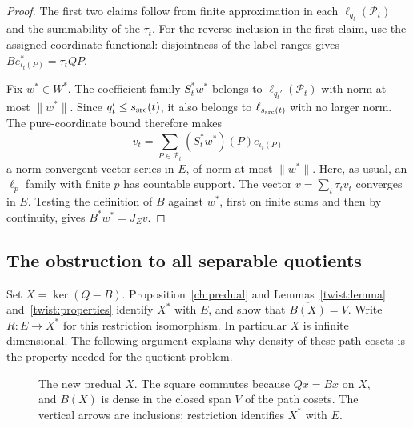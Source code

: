 \begin{proof}
The first two claims follow from finite approximation in each
$\ell_{q_t}(\mathcal P_t)$ and the summability of the $\tau_t$.
For the reverse inclusion in the first claim, use the assigned coordinate
functional: disjointness of the label ranges gives
$B e_{\iota_t(P)}^*=\tau_t QP$.

Fix $w^*\in W^*$. The coefficient family $S_t^*w^*$ belongs to
$\ell_{q_t'}(\mathcal P_t)$ with norm at most $\|w^*\|$.
Since $q_t'\le s_{\rm src}(t)$, it also belongs to $\ell_{s_{\rm src}(t)}$ with no larger
norm. The pure-coordinate bound therefore makes
\[
 v_t=\sum_{P\in\mathcal P_t}(S_t^*w^*)(P)e_{\iota_t(P)}
\]
a norm-convergent vector series in $E$, of norm at most $\|w^*\|$.
Here, as usual, an $\ell_p$ family with finite $p$ has countable support.
The vector $v=\sum_t\tau_t v_t$ converges in $E$. Testing the definition
of $B$ against $w^*$, first on finite sums and then by continuity, gives
$B^*w^*=J_Ev$.
\end{proof}

\subsection{The obstruction to all separable quotients}

Set $X=\ker(Q-B)$. Proposition~\ref{ch:predual} and Lemmas~\ref{twist:lemma}
and~\ref{twist:properties} identify $X^*$ with $E$, and show that
$\overline{B(X)}=V$. Write $R:E\to X^*$ for this restriction isomorphism. In particular
$X$ is infinite dimensional.
The following argument explains why density of these path cosets is the
property needed for the quotient problem.

\begin{figure}[ht]
\centering
{}
\caption{The new predual $X$. The square commutes because $Qx=Bx$ on
$X$, and $B(X)$ is dense in the closed span $V$ of the path cosets.
The vertical arrows are inclusions; restriction identifies $X^*$ with $E$.}
\label{fig:predual}
\end{figure}
\FloatBarrier


